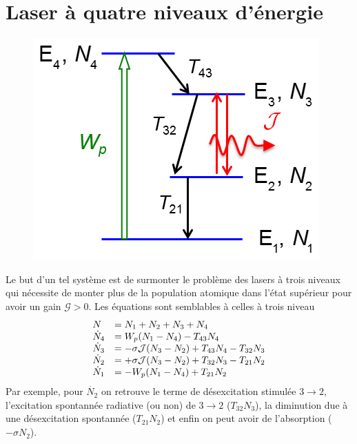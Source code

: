 \section{Laser à quatre niveaux d'énergie}
	\begin{figure}
	\vspace{-8mm}
	\includegraphics[scale=0.6]{ch4/image7.png}
	\end{figure}
Le but d'un tel système est de surmonter le problème des lasers à trois niveaux qui nécessite de
monter plus de la population atomique dans l'état supérieur pour avoir un gain $\mathcal{G}>0$. Les 
équations sont semblables à celles à trois niveau
\begin{equation}
\begin{array}{ll}
N &= {N_1} + {N_2} + {N_3} + {N_4}\\
{\dot N_4} &= {W_p}({N_1} - {N_4}) - {T_{43}}{N_4}\\
{\dot N_3} &=  - \sigma {{\cal J}}({N_3} - {N_2}) + {T_{43}}{N_4} - {T_{32}}{N_3}\\
{\dot N_2} &=  + \sigma {{\cal J}}({N_3} - {N_2}) + {T_{32}}{N_3} - {T_{21}}{N_2}\\
{\dot N_1} &=  - {W_p}({N_1} - {N_4}) + {T_{21}}{N_2}
\end{array}
\end{equation}
Par exemple, pour $\dot{N_2}$ on retrouve le terme de désexcitation stimulée $3\to 2$, l'excitation 
spontannée radiative (ou non) de $3\to 2$ ($T_{32}N_3$), la diminution due à une désexcitation 
spontannée ($T_{21}N_2$) et enfin on peut avoir de l'absorption ($-\sigma N_2$).\\

